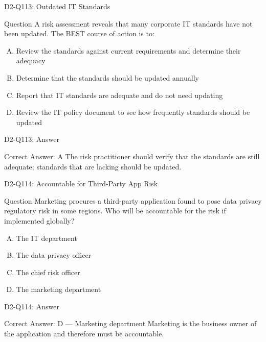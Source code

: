 \documentclass{beamer}
\begin{document}
	\begin{frame}{D2-Q113: Outdated IT Standards}
		\begin{block}{Question}
			A risk assessment reveals that many corporate IT standards have not been updated. The BEST course of action is to:
		\end{block}
		\begin{enumerate}[(A)]
			\item Review the standards against current requirements and determine their adequacy
			\item Determine that the standards should be updated annually
			\item Report that IT standards are adequate and do not need updating
			\item Review the IT policy document to see how frequently standards should be updated
		\end{enumerate}
	\end{frame}
	\begin{frame}{D2-Q113: Answer}
		\begin{block}{Correct Answer: A}
			The risk practitioner should verify that the standards are still adequate; standards that are lacking should be updated.
		\end{block}
	\end{frame}
	
	\begin{frame}{D2-Q114: Accountable for Third-Party App Risk}
		\begin{block}{Question}
			Marketing procures a third-party application found to pose data privacy regulatory risk in some regions. Who will be accountable for the risk if implemented globally?
		\end{block}
		\begin{enumerate}[(A)]
			\item The IT department
			\item The data privacy officer
			\item The chief risk officer
			\item The marketing department
		\end{enumerate}
	\end{frame}
	\begin{frame}{D2-Q114: Answer}
		\begin{block}{Correct Answer: D --- Marketing department}
			Marketing is the business owner of the application and therefore must be accountable.
		\end{block}
	\end{frame}
	
\end{document}
